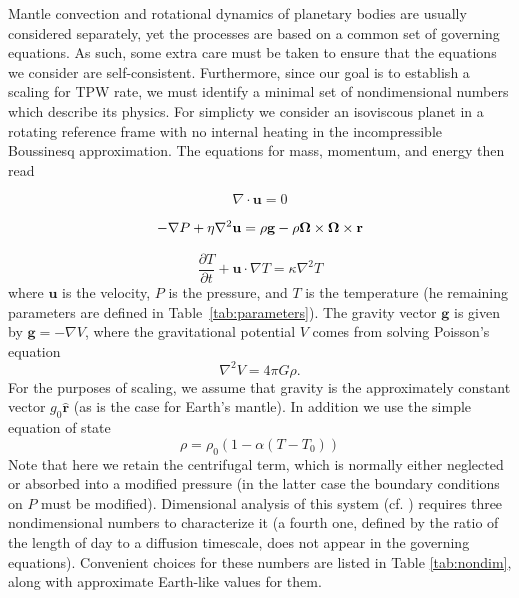 \documentclass[extra,mreferee]{gji}
\begin{document}
Mantle convection and rotational dynamics of planetary bodies are usually considered separately, yet the processes are based on a common set of governing equations. 
As such, some extra care must be taken to ensure that the equations we consider are self-consistent. 
Furthermore, since our goal is to establish a scaling for TPW rate, we must identify a minimal set of nondimensional numbers which describe its physics.
For simplicty we consider an isoviscous planet in a rotating reference frame with no internal heating in the incompressible Boussinesq approximation.  The equations for mass, momentum, and energy then read

\begin{equation}
\nabla \cdot \mathbf{u} = 0
\label{eq:conserve_mass}
\end{equation}

\begin{equation}
\begin{aligned}
- \nabla P + \eta \nabla^2 \mathbf{u} =  \rho \mathbf{g} -  \rho \mitbf{\Omega} \times \mitbf{\Omega} \times \mathbf{r}
\label{eq:navier_stokes}
\end{aligned}
\end{equation}

\begin{equation}
\frac{\partial T}{\partial t} + \mathbf{u} \cdot \nabla T = \kappa \nabla^2 T
\label{eq:energy}
\end{equation}
where $\mathbf{u}$ is the velocity, $P$ is the pressure, and $T$ is the temperature
(he remaining parameters are defined in Table~\ref{tab:parameters}).
The gravity vector $\mathbf{g}$ is given by $\mathbf{g} = -\nabla V$, where the 
gravitational potential $V$ comes from solving Poisson's equation
\begin{equation}
\nabla^2 V = 4 \pi G \rho.
\end{equation}
For the purposes of scaling, we assume that gravity is the approximately constant
vector $g_0 \mathbf{\hat{r}}$ (as is the case for Earth's mantle).
In addition we use the simple equation of state
\begin{equation}
\rho = \rho_0 \left( 1 - \alpha (T-T_0) \right)
\label{eq:eos}
\end{equation}
Note that here we retain the centrifugal term, which is normally either neglected or absorbed into a modified pressure
(in the latter case the boundary conditions on $P$ must be modified).
Dimensional analysis of this system (cf. \citet{barenblatt1996scaling}) requires three nondimensional numbers to characterize it
(a fourth one, defined by the ratio of the length of day to a diffusion timescale, does not appear in the governing equations).
Convenient choices for these numbers are listed in Table \ref{tab:nondim}, along with approximate Earth-like values for them.
\end{document}
